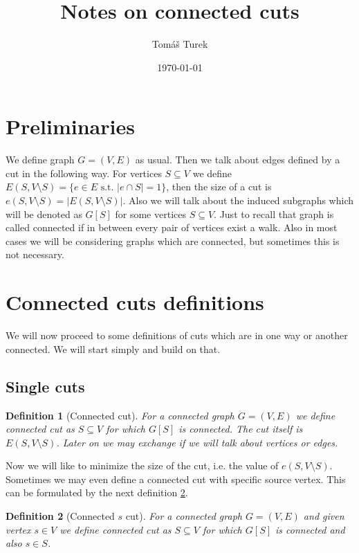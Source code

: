 \documentclass{article}
\title{Notes on connected cuts}
\author{Tomáš Turek}
\date{\today}
\theoremstyle{plain}
\theoremstyle{plain}
\newtheorem{defn}{Definition}
\theoremstyle{remark}
\begin{document}
	\maketitle
	
	\tableofcontents
	
	\section{Preliminaries}
	
	We define graph $G = (V,E)$ as usual. Then we talk about edges defined by a cut in the following way. For vertices $S \subseteq V$ we define $E(S, V \setminus S) = \{e \in E \text{ s.t. } |e \cap S| = 1\}$, then the size of a cut is $e(S, V \setminus S) = |E(S, V \setminus S)|$. Also we will talk about the induced subgraphs which will be denoted as $G[S]$ for some vertices $S \subseteq V$. Just to recall that graph is called connected if in between every pair of vertices exist a walk. Also in most cases we will be considering graphs which are connected, but sometimes this is not necessary.
	
	
	\section{Connected cuts definitions}
	
	We will now proceed to some definitions of cuts which are in one way or another connected. We will start simply and build on that.
	
	\subsection{Single cuts}
	
	\begin{defn}[Connected cut]
		For a connected graph $G = (V,E)$ we define connected cut as $S \subseteq V$ for which $G[S]$ is connected. The cut itself is $E(S, V \setminus S)$. Later on we may exchange if we will talk about vertices or edges.
		\label{def-connected-cut}
	\end{defn}
	
	Now we will like to minimize the size of the cut, i.e. the value of $e(S, V \setminus S)$. Sometimes we may even define a connected cut with specific source vertex. This can be formulated by the next definition \ref{def-connected-s-cut}.
	
	\begin{defn}[Connected $s$ cut]
		For a connected graph $G = (V,E)$ and given vertex $s \in V$ we define connected cut as $S \subseteq V$ for which $G[S]$ is connected and also $s \in S$.
		\label{def-connected-s-cut}
	\end{defn}
\end{document}
